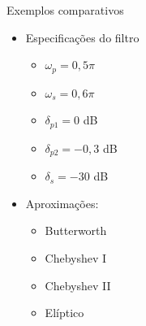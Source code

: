 \begin{slide}{Exemplos comparativos}
	\begin{itemize}
		\item Especificações do filtro
			\begin{itemize}
				\item $\omega_p = 0,5\pi$
				\item $\omega_s = 0,6\pi$
				\item $\delta_{p1} = 0$ dB
				\item $\delta_{p2} = -0,3$ dB
				\item $\delta_{s} = -30$ dB
			\end{itemize}
		\item Aproximações:
			\begin{itemize}
				\item Butterworth
				\item Chebyshev I
				\item Chebyshev II
				\item Elíptico
			\end{itemize}
	\end{itemize}
\end{slide}

